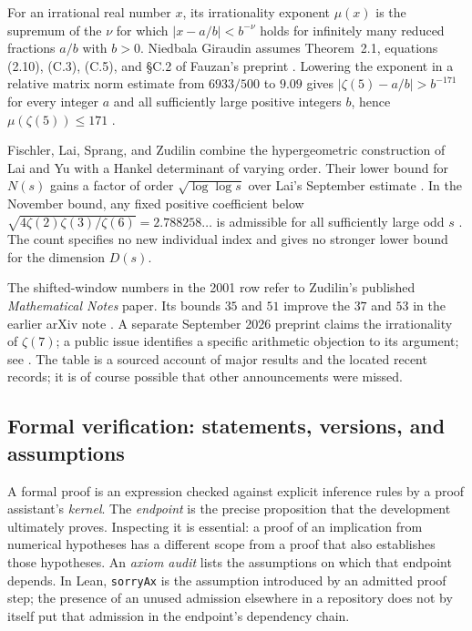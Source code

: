 \documentclass[11pt,letterpaper]{article}
\theoremstyle{definition}
\begin{document}
For an irrational real number $x$, its irrationality exponent $\mu(x)$ is
the supremum of the $\nu$ for which $|x-a/b|<b^{-\nu}$ holds for
infinitely many reduced fractions $a/b$ with $b>0$. Niedbala Giraudin
assumes Theorem~2.1, equations (2.10), (C.3), (C.5), and
\S C.2 of Fauzan's preprint \cite{fauzan2026}. Lowering the exponent
in a relative matrix norm estimate from $6933/500$ to $9.09$ gives
$|\zeta(5)-a/b|>b^{-171}$ for every integer $a$ and all sufficiently
large positive integers $b$, hence $\mu(\zeta(5))\leq171$
\cite[Thm.~1]{niedbalagiraudin2026}.

Fischler, Lai, Sprang, and Zudilin combine the hypergeometric construction
of Lai and Yu with a Hankel determinant of varying order. Their lower
bound for $N(s)$ gains a factor of order $\sqrt{\log\log s}$ over Lai's
September estimate \cite{laiyu2020,lai2026count,flsz2026}. In the
November bound, any fixed positive coefficient below
$\sqrt{4\zeta(2)\zeta(3)/\zeta(6)}=2.788258\ldots$ is admissible
for all sufficiently large odd $s$ \cite[Thm.~1.1]{flsz2026}.
The count specifies no new individual index and gives no stronger lower
bound for the dimension $D(s)$.

The shifted-window numbers in the 2001 row refer to Zudilin's published
\emph{Mathematical Notes} paper.  Its bounds $35$ and $51$ improve the
$37$ and $53$ in the earlier arXiv note \cite{zudilin2001note}.
 A separate September 2026 preprint claims the irrationality of $\zeta(7)$; a public issue identifies a
specific arithmetic objection to its argument; see \cite{anand2026,anandobjection}.  The table is a sourced account of major
results and the located recent records; it is of course possible that other announcements were missed.

\subsection{Formal verification: statements, versions, and assumptions}

A formal proof is an expression checked against explicit inference rules
by a proof assistant's \emph{kernel}.  The \emph{endpoint} is the precise
proposition that the development ultimately proves.  Inspecting it is
essential: a proof of an implication from numerical hypotheses has a
different scope from a proof that also establishes those hypotheses.
An \emph{axiom audit} lists the assumptions on which that endpoint depends.
In Lean, \texttt{sorryAx} is the assumption introduced by an admitted proof
step; the presence of an unused admission elsewhere in a repository does
not by itself put that admission in the endpoint's dependency chain.
\end{document}
